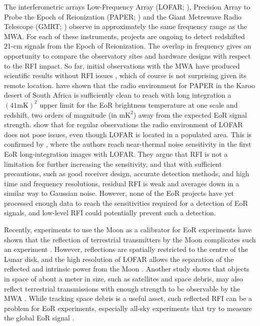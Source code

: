 \documentclass{pasa}
\newcommand{\editmark}[1]{{\color{red}{\textbf{#1}}}}
\begin{document}
The interferometric arrays Low-Frequency Array (LOFAR; \citealt{lofar-2013}), Precision Array to Probe the Epoch of Reionization (PAPER; \citealt{parsons-paper-eorlimit-2014}) and the Giant Metrewave Radio Telescope (GMRT; \citealt{the-gmrt-swarup-chapter-2013}) observe in approximately the same frequency range as the MWA. For each of these instruments, projects are ongoing to detect redshifted 21-cm signals from the Epoch of Reionization. The overlap in frequency gives an opportunity to compare the observatory sites and hardware designs with respect to the RFI impact. So far, initial observations with the MWA have produced scientific results without RFI issues \citep{hurley-walker-mwacs-2014, mckinley-fornaxa-2014, hindson-cluster-emission-2014}, which of course is not surprising given its remote location. \citet{parsons-paper-eorlimit-2014} have shown that the radio environment for PAPER in the Karoo desert of South Africa is sufficiently clean to reach with long integration a $(41 \textrm{mK})^2$ upper limit for the EoR brightness temperature at one scale and redshift, two orders of magnitude (in $\textrm{mK}^2$) away from the expected EoR signal strength. \citet{lofar-radio-environment} show that for regular observations the radio environment of LOFAR does not pose \editmark{unsurmountable} issues, even though LOFAR is located in a populated area. This is confirmed by \citet{ncp-eor-yatawatta}, where the authors reach near-thermal noise sensitivity in the first EoR long-integration images with LOFAR. They argue that RFI is not a limitation for further increasing the sensitivity, and \citet{offringa-rfi-distributions} \editmark{conclude} that with sufficient precautions, such as good receiver design, accurate detection methods, and high time and frequency resolutions, residual RFI is weak and averages down in a similar way to Gaussian noise. However, none of the EoR projects have yet processed enough data to reach the sensitivities required for a detection of EoR signals, and low-level RFI could potentially prevent such a detection.

Recently, experiments to use the Moon as a calibrator for EoR experiments have shown that the reflection of terrestrial transmitters by the Moon complicates such an experiment \citep{mckinley-moon-2013}. However, reflections are spatially restricted to the centre of the Lunar disk, and the high resolution of LOFAR allows the separation of the reflected and intrinsic power from the Moon \citep{vedantham-2014-todo}. Another study shows that objects in space of about a meter in size, such as satellites and space debris, may also reflect terrestrial transmissions with enough strength to be observable by the MWA \citep{tingay-space-debris-2013}. While tracking space debris is a useful asset, such reflected RFI can be a problem for EoR experiments, especially all-sky experiments that try to measure the global EoR signal \citep{vedantham-2014-todo}.
\end{document}
